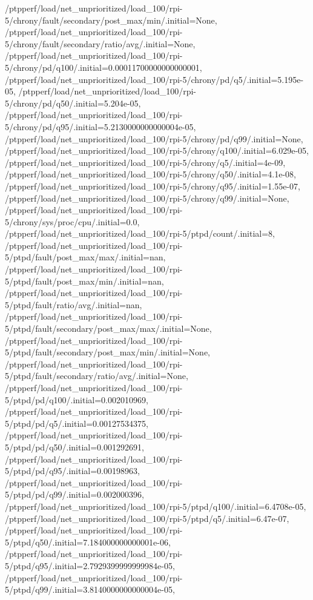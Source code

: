 {    /ptpperf/load/net_unprioritized/load_100/rpi-5/chrony/fault/secondary/post_max/min/.initial=None,
    /ptpperf/load/net_unprioritized/load_100/rpi-5/chrony/fault/secondary/ratio/avg/.initial=None,
    /ptpperf/load/net_unprioritized/load_100/rpi-5/chrony/pd/q100/.initial=0.00011700000000000001,
    /ptpperf/load/net_unprioritized/load_100/rpi-5/chrony/pd/q5/.initial=5.195e-05,
    /ptpperf/load/net_unprioritized/load_100/rpi-5/chrony/pd/q50/.initial=5.204e-05,
    /ptpperf/load/net_unprioritized/load_100/rpi-5/chrony/pd/q95/.initial=5.2130000000000004e-05,
    /ptpperf/load/net_unprioritized/load_100/rpi-5/chrony/pd/q99/.initial=None,
    /ptpperf/load/net_unprioritized/load_100/rpi-5/chrony/q100/.initial=6.029e-05,
    /ptpperf/load/net_unprioritized/load_100/rpi-5/chrony/q5/.initial=4e-09,
    /ptpperf/load/net_unprioritized/load_100/rpi-5/chrony/q50/.initial=4.1e-08,
    /ptpperf/load/net_unprioritized/load_100/rpi-5/chrony/q95/.initial=1.55e-07,
    /ptpperf/load/net_unprioritized/load_100/rpi-5/chrony/q99/.initial=None,
    /ptpperf/load/net_unprioritized/load_100/rpi-5/chrony/sys/proc/cpu/.initial=0.0,
    /ptpperf/load/net_unprioritized/load_100/rpi-5/ptpd/count/.initial=8,
    /ptpperf/load/net_unprioritized/load_100/rpi-5/ptpd/fault/post_max/max/.initial=nan,
    /ptpperf/load/net_unprioritized/load_100/rpi-5/ptpd/fault/post_max/min/.initial=nan,
    /ptpperf/load/net_unprioritized/load_100/rpi-5/ptpd/fault/ratio/avg/.initial=nan,
    /ptpperf/load/net_unprioritized/load_100/rpi-5/ptpd/fault/secondary/post_max/max/.initial=None,
    /ptpperf/load/net_unprioritized/load_100/rpi-5/ptpd/fault/secondary/post_max/min/.initial=None,
    /ptpperf/load/net_unprioritized/load_100/rpi-5/ptpd/fault/secondary/ratio/avg/.initial=None,
    /ptpperf/load/net_unprioritized/load_100/rpi-5/ptpd/pd/q100/.initial=0.002010969,
    /ptpperf/load/net_unprioritized/load_100/rpi-5/ptpd/pd/q5/.initial=0.00127534375,
    /ptpperf/load/net_unprioritized/load_100/rpi-5/ptpd/pd/q50/.initial=0.001292691,
    /ptpperf/load/net_unprioritized/load_100/rpi-5/ptpd/pd/q95/.initial=0.00198963,
    /ptpperf/load/net_unprioritized/load_100/rpi-5/ptpd/pd/q99/.initial=0.002000396,
    /ptpperf/load/net_unprioritized/load_100/rpi-5/ptpd/q100/.initial=6.4708e-05,
    /ptpperf/load/net_unprioritized/load_100/rpi-5/ptpd/q5/.initial=6.47e-07,
    /ptpperf/load/net_unprioritized/load_100/rpi-5/ptpd/q50/.initial=7.184000000000001e-06,
    /ptpperf/load/net_unprioritized/load_100/rpi-5/ptpd/q95/.initial=2.7929399999999984e-05,
    /ptpperf/load/net_unprioritized/load_100/rpi-5/ptpd/q99/.initial=3.8140000000000004e-05,
}
